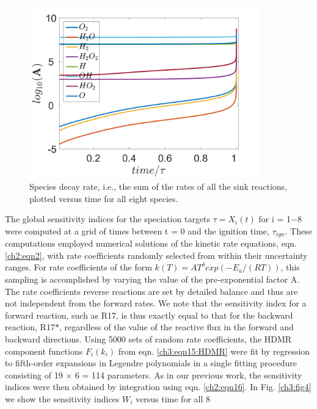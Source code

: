\begin{figure}[htbp]
	\caption[Species decay rates versus time of H$_2$-O$_2$ combustion system]{Species decay rate, i.e., the sum of the rates of all the sink reactions, plotted versus time for all eight species.}
    \begin{center}
	\includegraphics[width=100mm]{figs/chapter3/fig3.png}
    \end{center}
\label{ch3:fig3}
\end{figure}
The global sensitivity indices for the speciation targets $\tau=X_i(t)$ for i = 1−8 were computed at a grid of times between t =
0 and the ignition time, $\tau_{ign}$. These computations employed
numerical solutions of the kinetic rate equations, eqn. \ref{ch2:eqn2}, with
rate coefficients randomly selected from within their
uncertainty ranges. For rate coefficients of the form $k(T)=AT^{\delta}exp\left( -{E_a}/\left({RT}\right)\right)$, this sampling is accomplished by varying the value of the pre-exponential factor A. The rate coefficients
reverse reactions are set by detailed balance and thus are not
independent from the forward rates. We note that the
sensitivity index for a forward reaction, such as R17, is thus
exactly equal to that for the backward reaction, R17$\ast$, regardless
of the value of the reactive flux in the forward and backward
directions. Using 5000 sets of random rate coefficients, the
HDMR component functions $F_i(k_i)$ from eqn. \ref{ch3:eqn15:HDMR} were fit by
regression to fifth-order expansions in Legendre polynomials in
a single fitting procedure consisting of 19 $\times$ 6 = 114
parameters. As in our previous work, the sensitivity indices
were then obtained by integration using eqn. \ref{ch2:eqn16}.\cite{ch3_41_skodje2010theoretical,ch3_42_klippenstein2011uncertainty,ch3_43_davis2011global,ch3_44_zhou2013multitarget} In Fig. \ref{ch3:fig4} we show the sensitivity indices $W_i$ versus time for all 8
